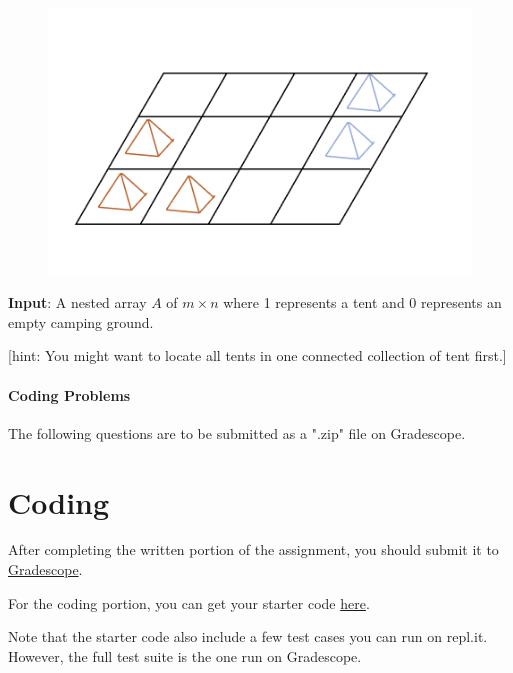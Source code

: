 \documentclass [12pt]{article}
\begin{document}
\begin{figure}[H]
    \centering
    \includegraphics[scale=0.5]{tent.png} 
    \label{fig:my_label}
\end{figure}

\textbf{Input}: A nested array $A$ of $m \times n$ where 1 represents a tent and 0 represents an empty camping ground. 

[hint: You might want to locate all tents in one connected collection of tent first.] 



\pagebreak
\begin{Instruction}

\paragraph{Coding Problems} The following questions are to be submitted as a ".zip" file on Gradescope. 

\end{Instruction}

\section{Coding }
After completing the written portion of the assignment, you should submit it to \href{https://www.gradescope.com/courses/350304}{Gradescope}.

For the coding portion, you can get your starter code \href{https://replit.com/team/COMP285/HW6-Code}{here}.

Note that the starter code also include a few test cases you can run on repl.it. However, the full test suite is the one run on Gradescope.
\end{document}
